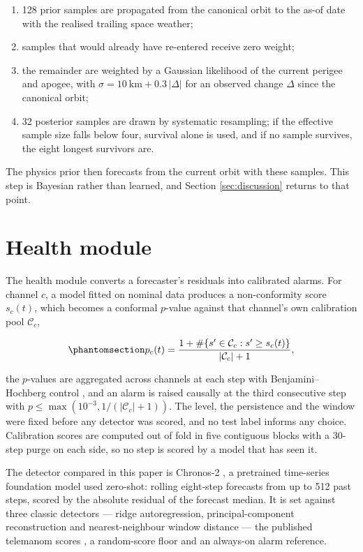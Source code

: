 \documentclass[3p,times]{elsarticle}
\providecommand{\tightlist}{\setlength{\itemsep}{0pt}\setlength{\parskip}{0pt}}
\providecommand{\tightlist}{\setlength{\itemsep}{0pt}\setlength{\parskip}{0pt}}
\begin{document}
\begin{enumerate}
\def\labelenumi{\arabic{enumi}.}
\tightlist
\item
  128 prior samples are propagated from the canonical orbit to the as-of
  date with the realised trailing space weather;
\item
  samples that would already have re-entered receive zero weight;
\item
  the remainder are weighted by a Gaussian likelihood of the current
  perigee and apogee, with \(\sigma = 10\ \text{km} + 0.3\,|\Delta|\)
  for an observed change \(\Delta\) since the canonical orbit;
\item
  32 posterior samples are drawn by systematic resampling; if the
  effective sample size falls below four, survival alone is used, and if
  no sample survives, the eight longest survivors are.
\end{enumerate}

The physics prior then forecasts from the current orbit with these
samples. This step is Bayesian rather than learned, and Section
\ref{sec:discussion} returns to that point.

\section{Health module}\label{sec:health}

The health module converts a forecaster's residuals into calibrated
alarms. For channel \(c\), a model fitted on nominal data produces a
non-conformity score \(s_c(t)\), which becomes a conformal \(p\)-value
against that channel's own calibration pool \(\mathcal{C}_c\),

\begin{equation}\protect\phantomsection\label{eq:pval}{p_c(t) = \frac{1 + \#\{s' \in \mathcal{C}_c : s' \geq s_c(t)\}}{|\mathcal{C}_c| + 1},}\end{equation}

the \(p\)-values are aggregated across channels at each step with
Benjamini--Hochberg control \citep{benjamini1995}, and an alarm is
raised causally at the third consecutive step with
\(p \leq \max(10^{-3}, 1/(|\mathcal{C}_c|+1))\). The level, the
persistence and the window were fixed before any detector was scored,
and no test label informs any choice. Calibration scores are computed
out of fold in five contiguous blocks with a 30-step purge on each side,
so no step is scored by a model that has seen it.

The detector compared in this paper is Chronos-2
\citep{ansari2025chronos2}, a pretrained time-series foundation model
used zero-shot: rolling eight-step forecasts from up to 512 past steps,
scored by the absolute residual of the forecast median. It is set
against three classic detectors --- ridge autoregression,
principal-component reconstruction and nearest-neighbour window distance
--- the published telemanom scores \citep{hundman2018}, a random-score
floor and an always-on alarm reference.
\end{document}
